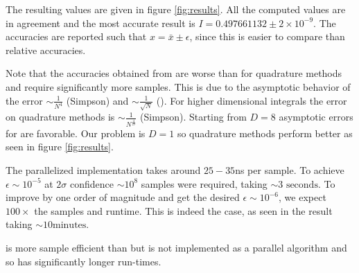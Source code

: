 \documentclass[10pt, a4paper]{article}
\newcommand{\finalval}{0.497661132 \pm 2\times10^{-9}}
\newcommand{\final}{$I = \finalval$}
\begin{document}

  The resulting values are given in figure \ref{fig:results}. All the computed values
  are in agreement and the most accurate result is \final. The accuracies are reported such that
  $x = \bar x \pm \epsilon$, since this is easier to compare than relative accuracies.

  Note that the accuracies obtained from \is{} are worse than for quadrature methods and require
  significantly more samples. This is due to the asymptotic behavior of the error $\sim \frac{1}{N^4}$
  (Simpson) and $\sim \frac{1}{\sqrt{N}}$ (\is). For higher dimensional integrals the error on quadrature
  methods is $\sim \frac{1}{N^{\frac4D}}$ (Simpson). Starting from $D=8$ asymptotic errors for \is{}
  are favorable. Our problem is $D=1$ so quadrature methods perform better as seen in figure \ref{fig:results}.

  The parallelized \is{} implementation takes around $25-35$ns per sample. To achieve $\epsilon \sim 10^{-5}$
  at $2\sigma$ confidence $\sim 10^{8}$ samples were required, taking $\sim 3\text{ seconds}$. To improve
  by one order of magnitude and get the desired $\epsilon \sim 10^{-6}$, we expect $100\times$ the
  samples and runtime. This is indeed the case, as seen in the \is{} result taking
  $\sim 10\text{minutes}$\footnotemark.


  \apis{} is more sample efficient than \is{} but is not implemented as a parallel algorithm and
  so has significantly longer run-times.
\end{document}
